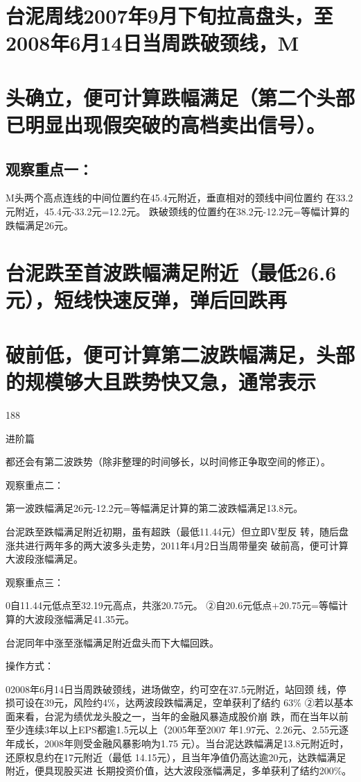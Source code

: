 \documentclass{article}
\begin{document}
\section{台泥周线2007年9月下旬拉高盘头，至2008年6月14日当周跌破颈线，M}

\section{头确立，便可计算跌幅满足（第二个头部已明显出现假突破的高档卖出信号）。}

\subsection{观察重点一：}

M头两个高点连线的中间位置约在45.4元附近，垂直相对的颈线中间位置约 在33.2元附近，45.4元-33.2元=12.2元。 跌破颈线的位置约在38.2元-12.2元=等幅计算的跌幅满足26元。

\section{台泥跌至首波跌幅满足附近（最低26.6元），短线快速反弹，弹后回跌再}

\section{破前低，便可计算第二波跌幅满足，头部的规模够大且跌势快又急，通常表示}

188

\clearpage

进阶篇

都还会有第二波跌势（除非整理的时间够长，以时间修正争取空间的修正）。

观察重点二：

第一波跌幅满足26元-12.2元=等幅满足计算的第二波跌幅满足13.8元。

台泥跌至跌幅满足附近初期，虽有超跌（最低11.44元）但立即V型反 转，随后盘涨共进行两年多的两大波多头走势，2011年4月2日当周带量突 破前高，便可计算大波段涨幅满足。

观察重点三：

0自11.44元低点至32.19元高点，共涨20.75元。 ②自20.6元低点+20.75元=等幅计算的大波段涨幅满足41.35元。

台泥同年中涨至涨幅满足附近盘头而下大幅回跌。

操作方式：

02008年6月14日当周跌破颈线，进场做空，约可空在37.5元附近，站回颈 线，停损可设在39元，风险约4\%，达两波段跌幅满足，空单获利了结约 63\% ②若以基本面来看，台泥为绩优龙头股之一，当年的金融风暴造成股价崩 跌，而在当年以前至少连续3年以上EPS都逾1.5元以上（2005年至2007 年1.97元、2.26元、2.55元逐年成长，2008年则受金融风暴影响为1.75 元）。当台泥达跌幅满足13.8元附近时，还原权息约在17元附近（最低 14.15元），且当年净值仍高达逾20元，达跌幅满足附近，便具现股买进 长期投资价值，达大波段涨幅满足，多单获利了结约200\%。
\end{document}
